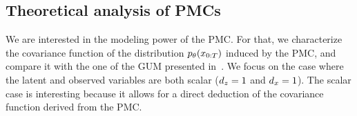     



\subsection{Theoretical analysis of PMCs}
We are interested in the modeling power of the PMC. 
For that, we characterize the covariance function
of the distribution $p_{\theta}(x_{0:T})$ induced by the PMC,
and compare it with the one of the GUM presented in~\cite{salaun2019comparing}.
We focus on the case where the latent and observed variables 
are both scalar ($d_z = 1$ and $d_x = 1$).
The scalar case is interesting because it allows for a direct deduction of 
the covariance function derived from the PMC. 

